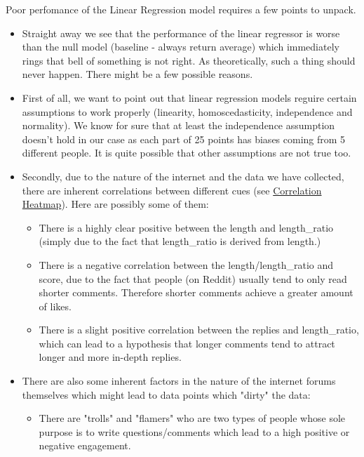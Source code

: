 \documentclass[11pt, oneside]{article}   	%
\begin{document}
Poor perfomance of the Linear Regression model requires a few points to unpack.
\begin{itemize}
    \item Straight away we see that the performance of the linear regressor is worse than the null model (baseline - always return average) which immediately rings that bell of something is not right. As theoretically, such a thing should never happen. There might be a few possible reasons.
    \item First of all, we want to point out that linear regression models reguire certain assumptions to work properly (linearity, homoscedasticity, independence and normality). We know for sure that at least the independence assumption doesn't hold in our case as each part of 25 points has biases coming from 5 different people. It is quite possible that other assumptions are not true too.
    \item Secondly, due to the nature of the internet and the data we have collected, there are inherent correlations between different cues (see \href{fig:correlation_heatmap}{Correlation Heatmap}). Here are possibly some of them:
    \begin{itemize}
        \item There is a highly clear positive between the length and length\_ratio (simply due to the fact that length\_ratio is derived from length.)
        \item There is a negative correlation between the length/length\_ratio and score, due to the fact that people (on Reddit) usually tend to only read shorter comments. Therefore shorter comments achieve a greater amount of likes.
        \item There is a slight positive correlation between the replies and length\_ratio, which can lead to a hypothesis that longer comments tend to attract longer and more in-depth replies.
    \end{itemize}
    \item There are also some inherent factors in the nature of the internet forums themselves which might lead to data points which "dirty" the data:
    \begin{itemize}
        \item There are "trolls" and "flamers" who are two types of people whose sole purpose is to write questions/comments which lead to a high positive or negative engagement.
    \end{itemize}
\end{itemize}
\end{document}
